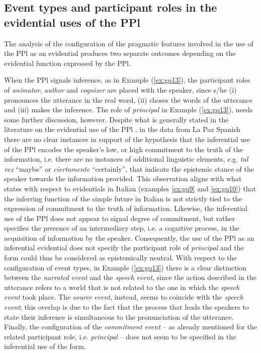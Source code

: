 \documentclass[output=paper]{langsci/langscibook}
\begin{document}
\subsection{Event types and participant roles in the evidential uses of the PPl}\label{s:gq4-3}

The analysis of the configuration of the pragmatic features involved in the use of the PPl as an evidential produces two separate outcomes depending on the evidential function expressed by the PPl. 

When the PPl signals inference, as in Example (\ref{ex:gq13}), the participant roles of \textit{animator}, \textit{author} and \textit{cognizer} are placed with the speaker, since s/he (i) pronounces the utterance in the real word, (ii) choses the words of the utterance and (iii) makes the inference. The role of \textit{principal} in Example (\ref{ex:gq13}), needs some further discussion, however. Despite what is generally stated in the literature on the evidential use of the PPl \citep{Speranza2014}, in the data from La Paz Spanish there are no clear instances in support of the hypothesis that the inferential use of the PPl encodes the speaker’s low, or high commitment to the truth of the information, i.e. there are no instances of additional linguistic elements, e.g. \textit{tal} \textit{vez} “maybe” or \textit{ciertamente} “certainly”, that indicate the epistemic stance of the speaker towards the information provided. This observation aligns with what \citet{Cornillie2009} states with respect to evidentials in Italian (examples \ref{ex:gq9} and \ref{ex:gq10}) that the inferring function of the simple future in Italian is not strictly tied to the expression of commitment to the truth of information. Likewise, the inferential use of the PPl does not appear to signal degree of commitment, but rather specifies the presence of an intermediary step, i.e. a cognitive process, in the acquisition of information by the speaker. Consequently, the use of the PPl as an inferential evidential does not specify the participant role of \textit{principal} and the form could thus be considered as epistemically neutral. With respect to the configuration of event types, in Example (\ref{ex:gq13}) there is a clear distinction between the \textit{narrated} \textit{event} and the \textit{speech} \textit{event}, since the action described in the utterance refers to a world that is not related to the one in which the \textit{speech} \textit{event} took place. The \textit{source} \textit{event}, instead, seems to coincide with the \textit{speech} \textit{event}; this overlap is due to the fact that the process that leads the speakers to state their inference is simultaneous to the pronunciation of the utterance. Finally, the configuration of the \textit{commitment} \textit{event} – as already mentioned for the related participant role, i.e. \textit{principal} \textit{–} does not seem to be specified in the inferential use of the form.
\end{document}
